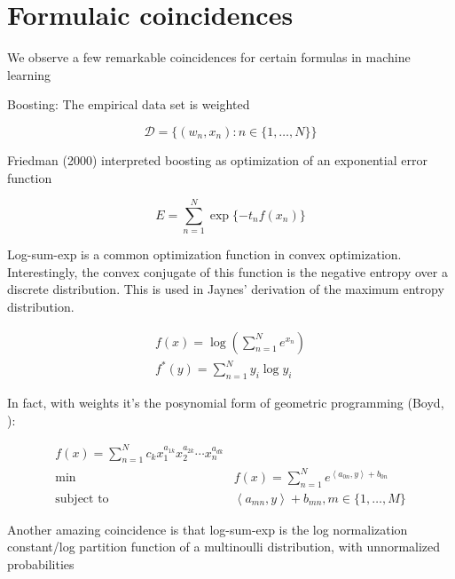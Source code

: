 \documentclass[a4paper]{article}
\begin{document}
\section{Formulaic coincidences}

We observe a few remarkable coincidences for certain formulas in machine learning

Boosting:
The empirical data set is weighted

\begin{equation}
  \mathcal{D} = \{ (w_n, x_n): n \in \{1, \ldots, N \} \}
  \label{}
\end{equation}

Friedman (2000) interpreted boosting as optimization of an exponential error function

\begin{equation}
  E = \sum_{n=1}^N \exp \{ -t_n f(x_n) \}
  \label{}
\end{equation}

Log-sum-exp is a common optimization function in convex optimization.  Interestingly, the convex conjugate of this function is the negative entropy over a discrete distribution.  
This is used in Jaynes' derivation of the maximum entropy distribution.

\begin{equation}
  \begin{split}
    f(x) = \log \left( \sum_{n=1}^N e^{x_n} \right) \\
    f^*(y) = \sum_{n=1}^N y_i \log y_i
  \end{split}
  \label{}
\end{equation}

In fact, with weights it's the posynomial form of geometric programming (Boyd, ):

\begin{equation}
  \begin{split}
    f(x) = \sum_{n=1}^N c_k x_1^{ a_{1k} } x_2^{ a_{ 2k } } \cdots x_n^{ a_{ dk } } \\
    \min \quad & f(x) = \sum_{n=1}^N e^{ \left< a_{0n}, y \right> + b_{0n} } \\
    \text{subject to} \quad & \left< a_{mn}, y \right> + b_{mn} , m \in \{ 1, \ldots, M \}
  \end{split}
  \label{}
\end{equation}

Another amazing coincidence is that log-sum-exp is the log normalization constant/log partition function of a multinoulli distribution, with unnormalized probabilities
\end{document}
